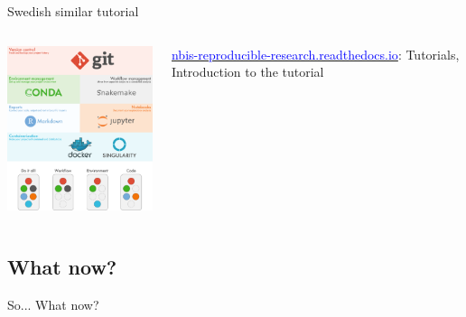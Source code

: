 \begin{frame}{Swedish similar tutorial}
\begin{columns}
\begin{column}{0.6\textwidth}
\begin{center}
    \includegraphics[width=6.5cm]{09_conclusion/images/NBIS_tutorials_overview.png}
\end{center}
\end{column}
\begin{column}{0.3\textwidth}
\begin{center}
    \href{https://nbis-reproducible-research.readthedocs.io/en/latest/tutorial_intro/%
    }{\textcolor{blue}{nbis-reproducible-research.readthedocs.io}}: Tutorials, Introduction to the tutorial
\end{center}
\end{column}
\end{columns}
\end{frame}

\subsection{What now?}

\begin{frame}{}

\huge{So... What now?}

\end{frame}

%
%
%
%

